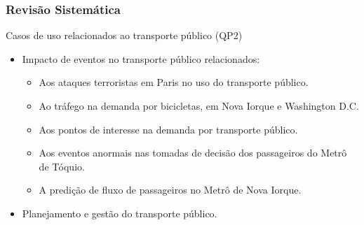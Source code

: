 \documentclass{beamer}
\begin{document}
\begin{frame}
\frametitle{Revisão Sistemática}
\begin{block}{Casos de uso relacionados ao transporte público (QP2)}
\begin{itemize}
\item Impacto de eventos no transporte público relacionados:
\begin{itemize}
\item \alert{Aos ataques terroristas em Paris no uso do transporte público}.
\item \alert{Ao tráfego na demanda por bicicletas, em Nova Iorque e Washington D.C}.
\item \alert{Aos pontos de interesse na demanda por transporte público}.
\item \alert{Aos eventos anormais nas tomadas de decisão dos passageiros do Metrô de Tóquio}.
\item \alert{A predição de fluxo de passageiros no Metrô de Nova Iorque}.
\end{itemize}

\item Planejamento e gestão do transporte público.
\end{itemize}
\end{block}

\end{frame}
\end{document}
